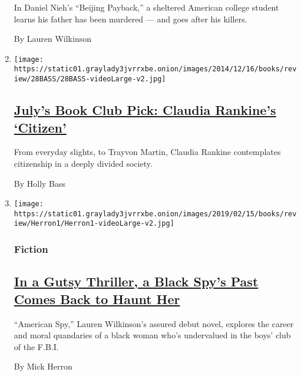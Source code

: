 \begin{enumerate}
  In Daniel Nieh's ``Beijing Payback,'' a sheltered American college
  student learns his father has been murdered --- and goes after his
  killers.

  By Lauren Wilkinson
\item
  \texttt{[image: https://static01.graylady3jvrrxbe.onion/images/2014/12/16/books/review/28BASS/28BASS-videoLarge-v2.jpg]}

  \hypertarget{julys-book-club-pick-claudia-rankines-citizen}{%
  \subsection{\texorpdfstring{\href{/2014/12/28/books/review/claudia-rankines-citizen.html}{July's
  Book Club Pick: Claudia Rankine's
  `Citizen'}}{July's Book Club Pick: Claudia Rankine's `Citizen'}}\label{julys-book-club-pick-claudia-rankines-citizen}}

  From everyday slights, to Trayvon Martin, Claudia Rankine contemplates
  citizenship in a deeply divided society.

  By Holly Bass
\item
  \texttt{[image: https://static01.graylady3jvrrxbe.onion/images/2019/02/15/books/review/Herron1/Herron1-videoLarge-v2.jpg]}

  \hypertarget{fiction}{%
  \subsubsection{Fiction}\label{fiction}}

  \hypertarget{in-a-gutsy-thriller-a-black-spys-past-comes-back-to-haunt-her}{%
  \subsection{\texorpdfstring{\href{/2019/02/20/books/review/american-spy-lauren-wilkinson.html}{In
  a Gutsy Thriller, a Black Spy's Past Comes Back to Haunt
  Her}}{In a Gutsy Thriller, a Black Spy's Past Comes Back to Haunt Her}}\label{in-a-gutsy-thriller-a-black-spys-past-comes-back-to-haunt-her}}

  ``American Spy,'' Lauren Wilkinson's assured debut novel, explores the
  career and moral quandaries of a black woman who's undervalued in the
  boys' club of the F.B.I.

  By Mick Herron
\end{enumerate}

